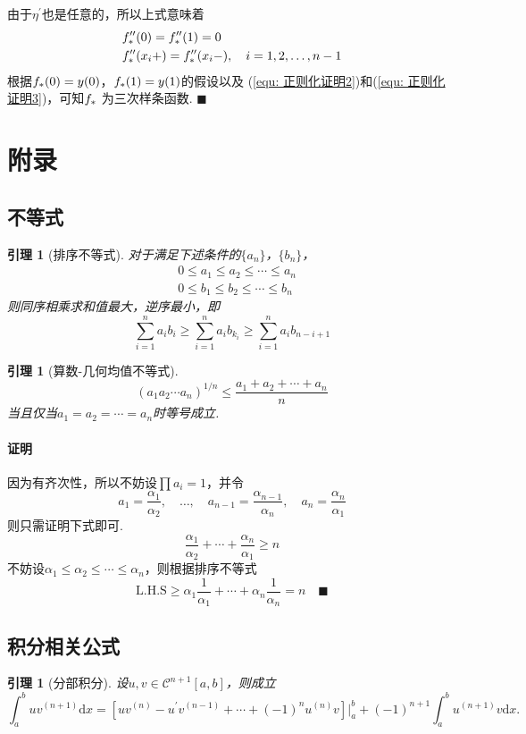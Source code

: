 \documentclass[12pt, a4paper]{article}
\theoremstyle{margin}
\newtheorem{lemma}[thm]{引理}
\newcommand{\pr}{\prime}
\newcommand{\hp}{^\prime}
\newcommand{\ms}{\mathscr}
\newcommand{\f}{\mathnormal{f}}
\newcommand{\rd}{\mathrm{d}}
\newcommand{\lhs}{\text{L.H.S}}
\newcommand\equref[1]{(\ref{#1})}
\newcommand{\proof}{\paragraph{证明}}
\begin{document}
    由于$\eta\hp$也是任意的，所以上式意味着
    \begin{equation}\begin{split}
      \label{equ: 正则化证明3}
      & \f_*^{\pr\pr}(0) = \f_*^{\pr\pr}(1) = 0\\
      & \f_*^{\pr\pr}(x_i+) = \f_*^{\pr\pr}(x_i-),\quad i = 1,2,\dots,n-1
    \end{split}\end{equation}
    根据$\f_*(0) = y(0)$，$\f_*(1) = y(1)$的假设以及
    \equref{equ: 正则化证明2}和\equref{equ: 正则化证明3}，可知$\f_*$
    为三次样条函数. $\blacksquare$






\newpage
\section{附录}
\subsection{不等式}

  \begin{lemma}[排序不等式]
    \label{lemma: 排序不等式}
    对于满足下述条件的$\{a_n\}$，$\{b_n\}$，
    \[\begin{split}
      & 0 \le a_1\le a_2\le\cdots\le a_n \\
      & 0 \le b_1\le b_2\le\cdots\le b_n
    \end{split}\]
    则同序相乘求和值最大，逆序最小，即
    \[
      \sum_{i=1}^n a_ib_i \ge \sum_{i=1}^n a_ib_{k_i}
      \ge \sum_{i=1}^n a_ib_{n-i+1}
    \]
  \end{lemma}

  \begin{lemma}[算数-几何均值不等式]
    \[
      (a_1a_2\cdots a_n)^{1/n} \le \frac{a_1+a_2+\cdots+a_n}{n}
    \]
    当且仅当$a_1 = a_2 = \cdots = a_n$时等号成立.
  \end{lemma}
  \proof
    因为有齐次性，所以不妨设$\prod a_i=1$，并令
    \[
      a_1=\frac{\alpha_1}{\alpha_2},\quad
      \dots,\quad
      a_{n-1} = \frac{\alpha_{n-1}}{\alpha_n},\quad
      a_n = \frac{\alpha_n}{\alpha_1}
    \]
    则只需证明下式即可.
    \[
      \frac{\alpha_1}{\alpha_2} + \cdots + \frac{\alpha_n}{\alpha_1}
      \ge n
    \]
    不妨设$\alpha_1 \le \alpha_2 \le \cdots \le \alpha_n$，则根据排序不等式
    \[
      \lhs \ge \alpha_1\frac{1}{\alpha_1} + \cdots + \alpha_n\frac{1}{\alpha_n}
       = n \quad\blacksquare
    \]

\newpage
\subsection{积分相关公式}
  \begin{lemma}[分部积分]
    设$u,v\in\ms{C}^{n+1}[a, b]$，则成立
    \[
      \int_a^buv^{(n+1)}\rd x =
      [ uv^{(n)} - u\hp v^{(n-1)} + \cdots +  (-1)^nu^{(n)}v]
      \bigg\vert_a^b + (-1)^{n+1}\int_a^bu^{(n+1)}v\rd x.
    \]
  \end{lemma}
\end{document}
